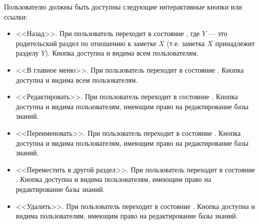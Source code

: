 \begin{enumerate}
                Пользователю должны быть доступны следующие интерактивные кнопки или ссылки:
                \begin{itemize}
                    \item
                        <<Назад>>.
                        При  пользователь переходит в состояние
                        \hyperref[itm:req:ui:states:navx]
                        {}, где \(Y\)
                        --- это родительский раздел по отношению к заметке \(X\)
                        (т.е. заметка \(X\) принадлежит разделу \(Y\)).
                        Кнопка доступна и видима всем пользователям.
                    \item
                        <<В главное меню>>.
                        При  пользователь переходит в состояние
                        \hyperref[itm:req:ui:states:mainmenu]
                        {}.
                        Кнопка доступна и видима всем пользователям.
                    \item
                        <<Редактировать>>.
                        При  пользователь переходит в состояние
                        \hyperref[itm:req:ui:states:edit-note]
                        {}.
                        Кнопка доступна и видима пользователям, имеющим право на редактирование базы знаний.
                    \item
                        <<Переименовать>>.
                        При  пользователь переходит в состояние
                        \hyperref[itm:req:ui:states:rename-kbo]
                        {}.
                        Кнопка доступна и видима пользователям, имеющим право на редактирование базы знаний.
                    \item
                        <<Переместить в другой раздел>>.
                        При  пользователь переходит в состояние
                        \hyperref[itm:req:ui:states:move-kbo]
                        {}.
                        Кнопка доступна и видима пользователям, имеющим право на редактирование базы знаний.
                    \item
                        <<Удалить>>.
                        При  пользователь переходит в состояние
                        \hyperref[itm:req:ui:states:delete-kbo]
                        {}.
                        Кнопка доступна и видима пользователям, имеющим право на редактирование базы знаний.
                \end{itemize}


\end{enumerate}
